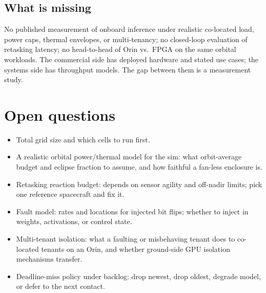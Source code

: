 \documentclass[11pt]{article}
\begin{document}
\subsection{What is missing}
No published measurement of onboard inference under realistic co-located load, power caps, thermal
envelopes, or multi-tenancy; no closed-loop evaluation of retasking latency; no head-to-head of Orin vs.\
FPGA on the same orbital workloads. The commercial side has deployed hardware and stated use cases; the
systems side has throughput models. The gap between them is a measurement study.

\section{Open questions}
\begin{itemize}
  \item Total grid size and which cells to run first.
  \item A realistic orbital power/thermal model for the sim: what orbit-average budget and eclipse
        fraction to assume, and how faithful a fan-less enclosure is.
  \item Retasking reaction budget: depends on sensor agility and off-nadir limits; pick one reference
        spacecraft and fix it.
  \item Fault model: rates and locations for injected bit flips; whether to inject in weights,
        activations, or control state.
  \item Multi-tenant isolation: what a faulting or misbehaving tenant does to co-located tenants on an
        Orin, and whether ground-side GPU isolation mechanisms transfer.
  \item Deadline-miss policy under backlog: drop newest, drop oldest, degrade model, or defer to the
        next contact.
\end{itemize}
\end{document}
